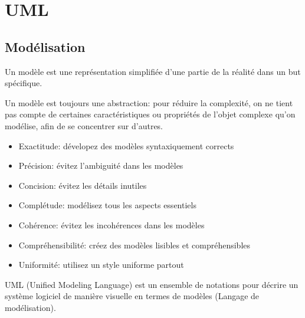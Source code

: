 \chapter{UML}\label{chap:uml}
\section{Modélisation}
\begin{definition}[Modèle]
    Un modèle est une représentation simplifiée d’une partie de la réalité dans un but spécifique.
\end{definition}
Un modèle est toujours une abstraction: pour réduire la complexité, on ne tient pas compte de certaines caractéristiques ou propriétés de l’objet complexe qu’on modélise, afin de se concentrer sur d’autres.

\begin{itemize}
    \item Exactitude: dévelopez des modèles syntaxiquement corrects
    \item Précision: évitez l’ambiguité dans les modèles 
    \item Concision: évitez les détails inutiles
    \item Complétude: modélisez tous les aspects essentiels 
    \item Cohérence: évitez les incohérences dans les modèles
    \item Compréhensibilité: créez des modèles lisibles et compréhensibles
    \item Uniformité: utilisez un style uniforme partout
\end{itemize}


\begin{definition}
    UML (Unified Modeling Language) est un ensemble de notations pour décrire un système logiciel de manière visuelle en termes de modèles (Langage de modélisation).
\end{definition}


